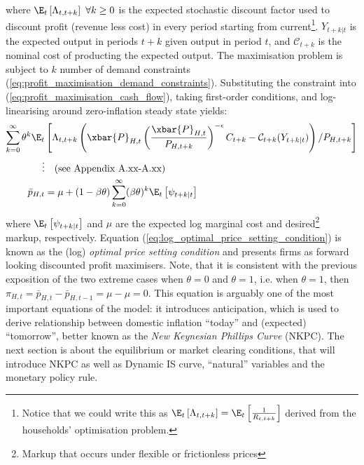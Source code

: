 where $\E_t \left[\Lambda_{t,t+k}\right]\ \forall k \geq 0$ is the expected stochastic discount factor used to discount profit (revenue less cost) in every period starting from current\footnote{Notice that we could write this as $\E_t \left[\Lambda_{t,t+k}\right]=\E_t \left[\frac{1}{R_{t, t+k}}\right]$ derived from the households' optimisation problem.}. $Y_{t+k|t}$ is the expected output in periods $t+k$ given output in period $t$, and $\mathcal{C}_{t+k}$ is the nominal cost of producting the expected output. The maximisation problem is subject to $k$ number of demand constraints (\ref{eq:profit_maximisation_demand_constraints}). Substituting the constraint into (\ref{eq:profit_maximisation_cash_flow}), taking first-order conditions, and log-linearising around zero-inflation steady state yields:
\begin{align}
    \sum_{k=0}^{\infty} \theta^k \E_t &\left[\Lambda_{t,t+k} \left( \xbar{P}_{H,t} \left(\frac{\xbar{P}_{H,t}}{P_{H,t+k}}\right)^{-\epsilon} C_{t+k} - \mathcal{C}_{t+k}(Y_{t+k|t})\right) / P_{H,t+k} \right] \\
    \vdots & \quad \text{(see Appendix A.xx-A.xx)} \nonumber \\
    \bar{p}_{H,t} &= \mu + (1-\beta \theta) \sum_{k=0}^{\infty} (\beta \theta)^{k} \E_t \left[ \psi_{t+k|t} \right] \label{eq:log_optimal_price_setting_condition}
\end{align}
where $\E_t \left[ \psi_{t+k|t} \right]$ and $\mu$ are the expected log marginal cost and desired\footnote{Markup that occurs under flexible or frictionless prices} markup, respectively. Equation (\ref{eq:log_optimal_price_setting_condition}) is known as the (log) \textit{optimal price setting condition} and presents firms as forward looking discounted profit maximisers. Note, that it is consistent with the previous exposition of the two extreme cases when $\theta = 0$ and $\theta = 1$, i.e. when $\theta = 1$, then $\pi_{H,t} = \bar{p}_{H,t} - \bar{p}_{H,t-1} = \mu - \mu = 0$. This equation is arguably one of the most important equations of the model: it introduces anticipation, which is used to derive relationship between domestic inflation ``today'' and (expected) ``tomorrow'', better known as the \textit{New Keynesian Phillips Curve} (NKPC). The next section is about the equilibrium or market clearing conditions, that will introduce NKPC as well as Dynamic IS curve, ``natural'' variables and the monetary policy rule. 